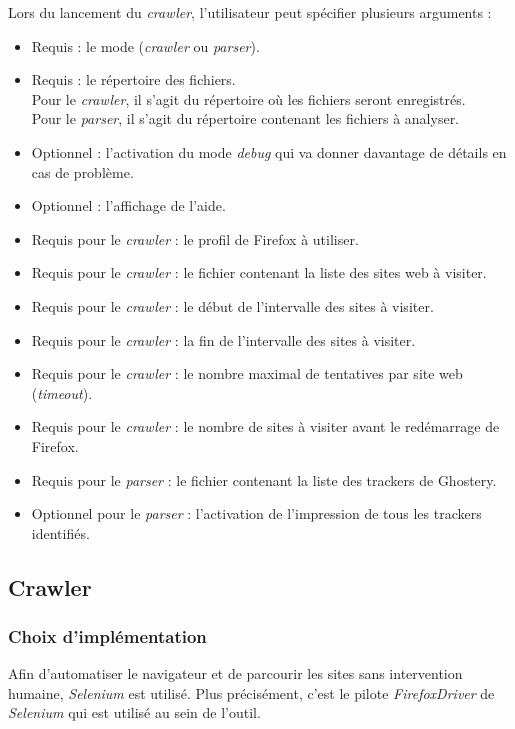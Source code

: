 Lors du lancement du \textit{crawler}, l'utilisateur peut spécifier plusieurs arguments :
\begin{itemize}
	\item Requis : le mode (\textit{crawler} ou \textit{parser}).
	\item Requis : le répertoire des fichiers.\\
		Pour le \textit{crawler}, il s'agit du répertoire où les fichiers seront enregistrés.\\
		Pour le \textit{parser}, il s'agit du répertoire contenant les fichiers à analyser.
	\item Optionnel : l'activation du mode \textit{debug} qui va donner davantage de détails en cas de problème.
	\item Optionnel : l'affichage de l'aide.
	\newline
	\item Requis pour le \textit{crawler} : le profil de Firefox à utiliser.
	\item Requis pour le \textit{crawler} : le fichier contenant la liste des sites web à visiter.
	\item Requis pour le \textit{crawler} : le début de l'intervalle des sites à visiter.
	\item Requis pour le \textit{crawler} : la fin de l'intervalle des sites à visiter.
	\item Requis pour le \textit{crawler} : le nombre maximal de tentatives par site web (\textit{timeout}).
	\item Requis pour le \textit{crawler} : le nombre de sites à visiter avant le redémarrage de Firefox.
	\newline
	\item Requis pour le \textit{parser} : le fichier contenant la liste des trackers de Ghostery.
	\item Optionnel pour le \textit{parser} : l'activation de l'impression de tous les trackers identifiés.
\end{itemize}

\subsection{Crawler}
\label{crawler}
\subsubsection{Choix d'implémentation}
Afin d'automatiser le navigateur et de parcourir les sites sans intervention humaine, \textit{Selenium} \cite{selenium_homepage} est utilisé. Plus précisément, c'est le pilote \textit{FirefoxDriver} de \textit{Selenium} qui est utilisé au sein de l'outil.

